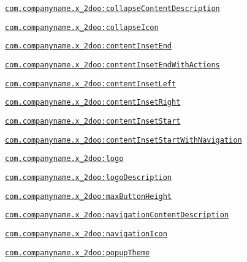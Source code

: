 {\tt \hyperlink{classandroid_1_1support_1_1v4_1_1_r_1_1styleable_052a3e0cd00166bf0033ee070e9469d0}{com.companyname.x\_\-2doo:collapseContentDescription}}

{\tt \hyperlink{classandroid_1_1support_1_1v4_1_1_r_1_1styleable_67413495dc779683b34ca10d393484e9}{com.companyname.x\_\-2doo:collapseIcon}}

{\tt \hyperlink{classandroid_1_1support_1_1v4_1_1_r_1_1styleable_a11d101535df2818c53046e1bbf21eb3}{com.companyname.x\_\-2doo:contentInsetEnd}}

{\tt \hyperlink{classandroid_1_1support_1_1v4_1_1_r_1_1styleable_40116b816489b853ec057c9c36ebe7c1}{com.companyname.x\_\-2doo:contentInsetEndWithActions}}

{\tt \hyperlink{classandroid_1_1support_1_1v4_1_1_r_1_1styleable_58d0345a39808d32a1f60119991bb07e}{com.companyname.x\_\-2doo:contentInsetLeft}}

{\tt \hyperlink{classandroid_1_1support_1_1v4_1_1_r_1_1styleable_ec6d939ba7f23b71e3f71aaffe7cde62}{com.companyname.x\_\-2doo:contentInsetRight}}

{\tt \hyperlink{classandroid_1_1support_1_1v4_1_1_r_1_1styleable_829314820a2efd83c9b3b622103a1c68}{com.companyname.x\_\-2doo:contentInsetStart}}

{\tt \hyperlink{classandroid_1_1support_1_1v4_1_1_r_1_1styleable_f5a322ce2aca1623eb518f2758625f9c}{com.companyname.x\_\-2doo:contentInsetStartWithNavigation}}

{\tt \hyperlink{classandroid_1_1support_1_1v4_1_1_r_1_1styleable_f2d9f9e988308a57d3c026af6b7fbbed}{com.companyname.x\_\-2doo:logo}}

{\tt \hyperlink{classandroid_1_1support_1_1v4_1_1_r_1_1styleable_511de55d75e2413a6ebdeee92758f44f}{com.companyname.x\_\-2doo:logoDescription}}

{\tt \hyperlink{classandroid_1_1support_1_1v4_1_1_r_1_1styleable_ab5a559be253c4d3f91654f99866d524}{com.companyname.x\_\-2doo:maxButtonHeight}}

{\tt \hyperlink{classandroid_1_1support_1_1v4_1_1_r_1_1styleable_18960c8315e8816542d771ce838c8551}{com.companyname.x\_\-2doo:navigationContentDescription}}

{\tt \hyperlink{classandroid_1_1support_1_1v4_1_1_r_1_1styleable_91d5fad8e57cec704e2157d1f6a7b331}{com.companyname.x\_\-2doo:navigationIcon}}

{\tt \hyperlink{classandroid_1_1support_1_1v4_1_1_r_1_1styleable_988c9145b755a926e12ec19da469cd62}{com.companyname.x\_\-2doo:popupTheme}}

